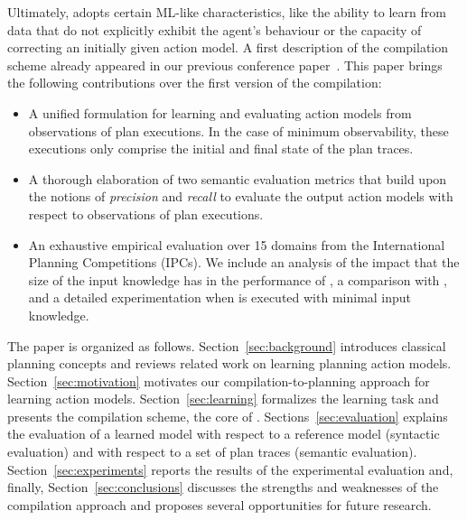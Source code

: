 Ultimately, \FAMA adopts certain ML-like characteristics, like the ability to learn from data that do not explicitly exhibit the agent's behaviour or the capacity of correcting an initially given action model. A first description of the \FAMA compilation scheme already appeared in our previous conference paper~\cite{aineto2018learning}. This paper brings the following contributions over the first version of the compilation:

\begin{itemize}
\item A unified formulation for learning and evaluating action models from observations of plan executions. In the case of minimum observability, these executions only comprise the initial and final state of the plan traces.
\item A thorough elaboration of two semantic evaluation metrics that build upon the notions of {\em precision} and {\em recall} to evaluate the output action models with respect to observations of plan executions.
\item An exhaustive empirical evaluation over 15 domains from the International Planning Competitions (IPCs). We include an analysis of the impact that the size of the input knowledge has in the performance of \FAMA, a comparison with \ARMS, and a detailed experimentation when \FAMA is executed with minimal input knowledge.
\end{itemize}


The paper is organized as follows. Section~\ref{sec:background} introduces classical planning concepts and reviews related work on learning planning action models. Section~\ref{sec:motivation} motivates our compilation-to-planning approach for learning action models. Section~\ref{sec:learning} formalizes the learning task and presents the compilation scheme, the core of \FAMA. Sections~\ref{sec:evaluation} explains the evaluation of a learned model with respect to a reference model (syntactic evaluation) and with respect to a set of plan traces (semantic evaluation). Section~\ref{sec:experiments} reports the results of the experimental evaluation and, finally, Section~\ref{sec:conclusions} discusses the strengths and weaknesses of the compilation approach and proposes several opportunities for future research.









